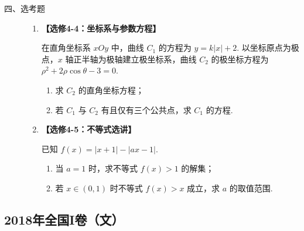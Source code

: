 \begin{description}

    \item[四、选考题]

    \begin{enumerate}[leftmargin=5pt]

      \addtocounter{enumi}{+21}

        \item \textbf{【选修4-4：坐标系与参数方程】}

在直角坐标系 \(xOy\) 中，曲线 \(C_1\) 的方程为 \(y=k\lvert x\rvert+2\). 以坐标原点为极点，\(x\) 轴正半轴为极轴建立极坐标系，曲线 \(C_2\) 的极坐标方程为 \(\rho^2+2\rho\cos\theta-3=0\).

\begin{enumerate}
\item 求 \(C_2\) 的直角坐标方程；
\item 若 \(C_1\) 与 \(C_2\) 有且仅有三个公共点，求 \(C_1\) 的方程.
\end{enumerate}

        \item \textbf{【选修4-5：不等式选讲】}

已知 \(f(x)=\lvert x+1\rvert-\lvert ax-1\rvert\).

\begin{enumerate}
\item 当 \(a=1\) 时，求不等式 \(f(x)>1\) 的解集；
\item 若 \(x\in(0,1)\) 时不等式 \(f(x)>x\) 成立，求 \(a\) 的取值范围.
\end{enumerate}

    \end{enumerate}

\end{description}


\subsection{2018年全国I卷（文）}\label{gk:2018年全国I卷（文）}

